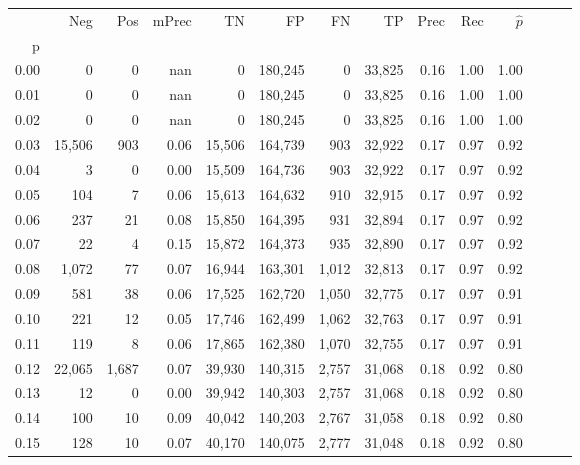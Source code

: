 \begin{tabular}{rrrrrrrrrrrrrr}
\toprule
{} &     Neg &    Pos & mPrec &       TN &       FP &      FN &      TP &  Prec &   Rec & $\hat{p}$ \\
p    &         &        &       &          &          &         &         &       &       &           \\
\midrule
0.00 &       0 &      0 &   nan &        0 &  180,245 &       0 &  33,825 &  0.16 &  1.00 &      1.00 \\
0.01 &       0 &      0 &   nan &        0 &  180,245 &       0 &  33,825 &  0.16 &  1.00 &      1.00 \\
0.02 &       0 &      0 &   nan &        0 &  180,245 &       0 &  33,825 &  0.16 &  1.00 &      1.00 \\
0.03 &  15,506 &    903 &  0.06 &   15,506 &  164,739 &     903 &  32,922 &  0.17 &  0.97 &      0.92 \\
0.04 &       3 &      0 &  0.00 &   15,509 &  164,736 &     903 &  32,922 &  0.17 &  0.97 &      0.92 \\
0.05 &     104 &      7 &  0.06 &   15,613 &  164,632 &     910 &  32,915 &  0.17 &  0.97 &      0.92 \\
0.06 &     237 &     21 &  0.08 &   15,850 &  164,395 &     931 &  32,894 &  0.17 &  0.97 &      0.92 \\
0.07 &      22 &      4 &  0.15 &   15,872 &  164,373 &     935 &  32,890 &  0.17 &  0.97 &      0.92 \\
0.08 &   1,072 &     77 &  0.07 &   16,944 &  163,301 &   1,012 &  32,813 &  0.17 &  0.97 &      0.92 \\
0.09 &     581 &     38 &  0.06 &   17,525 &  162,720 &   1,050 &  32,775 &  0.17 &  0.97 &      0.91 \\
0.10 &     221 &     12 &  0.05 &   17,746 &  162,499 &   1,062 &  32,763 &  0.17 &  0.97 &      0.91 \\
0.11 &     119 &      8 &  0.06 &   17,865 &  162,380 &   1,070 &  32,755 &  0.17 &  0.97 &      0.91 \\
0.12 &  22,065 &  1,687 &  0.07 &   39,930 &  140,315 &   2,757 &  31,068 &  0.18 &  0.92 &      0.80 \\
0.13 &      12 &      0 &  0.00 &   39,942 &  140,303 &   2,757 &  31,068 &  0.18 &  0.92 &      0.80 \\
0.14 &     100 &     10 &  0.09 &   40,042 &  140,203 &   2,767 &  31,058 &  0.18 &  0.92 &      0.80 \\
0.15 &     128 &     10 &  0.07 &   40,170 &  140,075 &   2,777 &  31,048 &  0.18 &  0.92 &      0.80 \\

\end{tabular}
